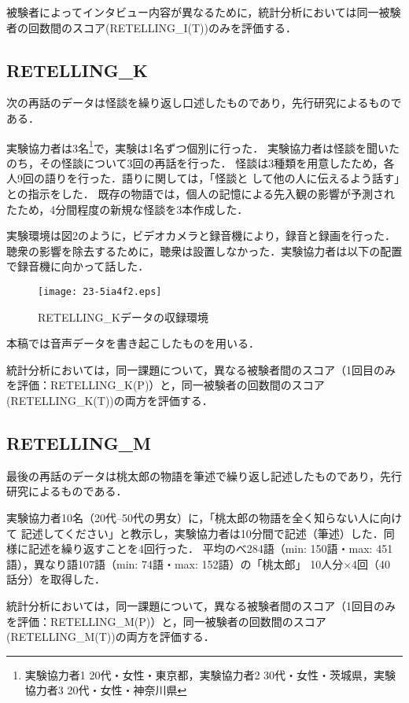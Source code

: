 \documentclass[japanese]{jnlp_1.4}
\begin{document}
被験者によってインタビュー内容が異なるために，統計分析においては同一被験者の回数間のスコア(RETELLING\_I(T))のみを評価する．


\subsection{RETELLING\_K}

次の再話のデータは怪談を繰り返し口述したものであり，先行研究\cite{yasuda-2012-JCSS}によるものである．

実験協力者は3名\footnote{実験協力者1 20代・女性・東京都，実験協力者2 30代・女性・茨城県，実験協力者3 20代・女性・神奈川県}で，実験は1名ずつ個別に行った．
実験協力者は怪談を聞いたのち，その怪談について3回の再話を行った．
怪談は3種類を用意したため，各人9回の語りを行った．語りに関しては，「怪談と
して他の人に伝えるよう話す」との指示をした．
既存の物語では，個人の記憶による先入観の影響が予測されたため，4分間程度の新規な怪談を3本作成した．

実験環境は図2のように，ビデオカメラと録音機により，録音と録画を行った．聴衆の影響を除去するために，聴衆は設置しなかった．実験協力者は以下の配置で録音機に向かって話した． 

\begin{figure}[t]
\begin{center}
\texttt{[image: 23-5ia4f2.eps]}
\end{center}
\caption{RETELLING\_Kデータの収録環境}
\end{figure}

本稿では音声データを書き起こしたものを用いる．

統計分析においては，同一課題について，異なる被験者間のスコア（1回目のみ
を評価：RETELLING\_K(P)）と，同一被験者の回数間のスコア
(RETELLING\_K(T))の両方を評価する．


\subsection{RETELLING\_M}

最後の再話のデータは桃太郎の物語を筆述で繰り返し記述したものであり，先行研究\cite{yasuda-2014-JASS33}によるものである．

実験協力者10名（20代--50代の男女）に，「桃太郎の物語を全く知らない人に向けて
記述してください」と教示し，実験協力者は10分間で記述（筆述）した．同様に記述を繰り返すことを4回行った．
平均のべ284語（min: 150語・max: 451語），異なり語107語（min: 74語・max: 152語）の「桃太郎」 10人分×4回（40 話分）を取得した．

統計分析においては，同一課題について，異なる被験者間のスコア（1回目のみ
を評価：RETELLING\_M(P)）と，同一被験者の回数間のスコア
(RETELLING\_M(T))の両方を評価する．
\end{document}
